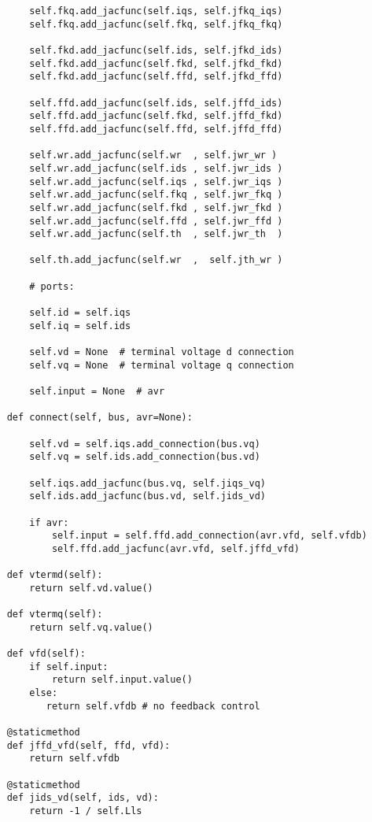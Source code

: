 \begin{lstlisting}
        self.fkq.add_jacfunc(self.iqs, self.jfkq_iqs)
        self.fkq.add_jacfunc(self.fkq, self.jfkq_fkq)

        self.fkd.add_jacfunc(self.ids, self.jfkd_ids)
        self.fkd.add_jacfunc(self.fkd, self.jfkd_fkd)
        self.fkd.add_jacfunc(self.ffd, self.jfkd_ffd)

        self.ffd.add_jacfunc(self.ids, self.jffd_ids)
        self.ffd.add_jacfunc(self.fkd, self.jffd_fkd)
        self.ffd.add_jacfunc(self.ffd, self.jffd_ffd)

        self.wr.add_jacfunc(self.wr  , self.jwr_wr )
        self.wr.add_jacfunc(self.ids , self.jwr_ids )
        self.wr.add_jacfunc(self.iqs , self.jwr_iqs )
        self.wr.add_jacfunc(self.fkq , self.jwr_fkq )
        self.wr.add_jacfunc(self.fkd , self.jwr_fkd )
        self.wr.add_jacfunc(self.ffd , self.jwr_ffd )
        self.wr.add_jacfunc(self.th  , self.jwr_th  )

        self.th.add_jacfunc(self.wr  ,  self.jth_wr )

        # ports:

        self.id = self.iqs
        self.iq = self.ids

        self.vd = None  # terminal voltage d connection
        self.vq = None  # terminal voltage q connection

        self.input = None  # avr

    def connect(self, bus, avr=None):

        self.vd = self.iqs.add_connection(bus.vq)
        self.vq = self.ids.add_connection(bus.vd)

        self.iqs.add_jacfunc(bus.vq, self.jiqs_vq)
        self.ids.add_jacfunc(bus.vd, self.jids_vd)

        if avr:
            self.input = self.ffd.add_connection(avr.vfd, self.vfdb)
            self.ffd.add_jacfunc(avr.vfd, self.jffd_vfd)

    def vtermd(self):
        return self.vd.value()

    def vtermq(self):
        return self.vq.value()

    def vfd(self):
        if self.input:
            return self.input.value()
        else:
           return self.vfdb # no feedback control

    @staticmethod
    def jffd_vfd(self, ffd, vfd):
        return self.vfdb

    @staticmethod
    def jids_vd(self, ids, vd):
        return -1 / self.Lls


\end{lstlisting}
